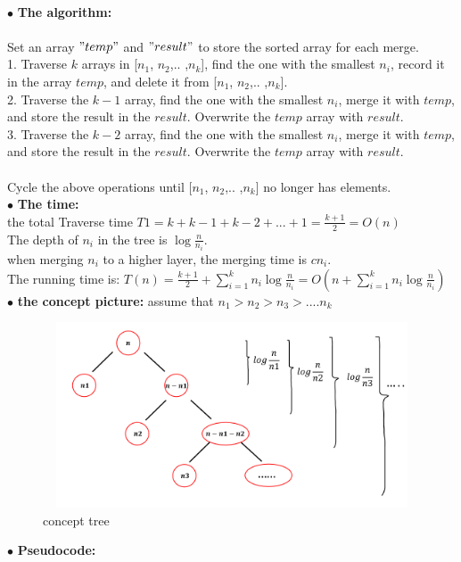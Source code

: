 \documentclass[12pt,a4paper]{article}
\newcommand{\question}[1]{\bigskip\noindent{\textbf{Q{#1} solution}}}
\begin{document}
\question{14.C}\\
$\bullet$ \textbf{The algorithm:}\\\\
Set an array $"temp"$ and $"result"$ to store the sorted array for each merge.\\
1. Traverse $k$ arrays in [$n_1$, $n_2$,.. ,$n_k$], find the one with the smallest $n_i$, record it in the array $temp$, and delete it from [$n_1$, $n_2$,.. ,$n_k$].\\
2. Traverse the $k-1$ array, find the one with the smallest $n_i$, merge it with $temp$, and store the result in the $result$. Overwrite the $temp$ array with $result$.\\
3. Traverse the $k-2$ array, find the one with the smallest $n_i$, merge it with $temp$, and store the result in the $result$. Overwrite the $temp$ array with $result$.\\\\
Cycle the above operations until [$n_1$, $n_2$,.. ,$n_k$] no longer has elements.\\
$\bullet$ \textbf{The time:}\\
the total Traverse time $T1 = k+k-1+k-2+...+1 = \frac{k+1}{2} = O(n)$\\
The depth of $n_i$ in the tree is $\log{\frac{n}{n_i}}$.\\
when merging $n_i$ to a higher layer, the merging time is $cn_i$.\\
The running time is: $T(n) = \frac{k+1}{2}+ \sum^k_{i=1}{n_i\log{\frac{n}{n_i}}} = O(n+\sum^k_{i=1}{n_i\log{\frac{n}{n_i}}})$\\
$\bullet$ \textbf{the concept picture:} assume that $n_1>n_2>n_3>$....$n_k$\\
	\begin{figure}[H]
	\centering %
	\includegraphics[height=5.5cm,width=12.5cm]{picture//Q14C2.png}
	\caption{concept tree}
	\end{figure}
\noindent
$\bullet$ \textbf{Pseudocode:}
\end{document}
